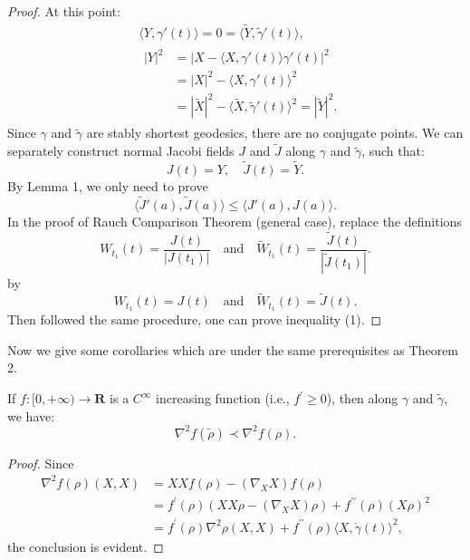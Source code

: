 \documentclass{ctexart}
\begin{document}
\begin{proof}[Proof]
  At this point:
  $$
  \begin{aligned}
  & \langle Y, \gamma'(t)\rangle = 0 = \langle\widetilde{Y}, \tilde{\gamma}'(t)\rangle, \\
  &\begin{aligned}
    |Y|^2 
    &= |X-\langle X, \gamma'(t)\rangle \gamma'(t)|^2 \\
    &= |X|^2-\langle X, \gamma'(t)\rangle^2 \\
    &= |\widetilde{X}|^2-\langle\widetilde{X}, \widetilde{\gamma}'(t)\rangle^2=|\widetilde{Y}|^2 .
    \end{aligned}
  \end{aligned}
  $$
  Since $\gamma$ and $\widetilde{\gamma}$ are stably shortest geodesics, there are no conjugate points. 
  We can separately construct normal Jacobi fields $J$ and $\widetilde{J}$ along $\gamma$ and $\widetilde{\gamma}$, such that:
  $$
  J(t) = Y, \quad \widetilde{J}(t) = \widetilde{Y}.
  $$
  By Lemma 1, we only need to prove 
  \begin{equation}
    \langle \tilde{J}'\left(a\right),\tilde{J}\left(a\right)\rangle \leq \langle J'\left(a\right),J\left(a\right)\rangle. 
  \end{equation}
  In the proof of Rauch Comparison Theorem (general case), replace the definitions 
  $$
  W_{t_1}(t) = \frac{J(t)}{\left|J(t_1)\right|} \quad \text{and} \quad \tilde{W}_{t_1}(t) = \frac{\tilde{J}(t)}{\left|\tilde{J}(t_1)\right|}.
  $$
  by
  $$
  W_{t_1}(t) = J(t) \quad \text{and} \quad \tilde{W}_{t_1}(t) = \tilde{J}(t).
  $$
  Then followed the same procedure, one can prove inequality (1).
\end{proof}

Now we give some corollaries which are under the same prerequisites as Theorem 2.
\begin{corollary}
  If $f:[0, +\infty) \rightarrow \mathbf{R}$ is a $C^\infty$ increasing function (i.e., $f^\prime \geq 0$), then along $\gamma$ and $\widetilde{\gamma}$, we have:
  $$
  \nabla^2 f(\widetilde{\rho}) \prec  \nabla^2 f(\rho).
  $$  
\end{corollary}
\begin{proof}[Proof]
  Since
  $$
  \begin{aligned}
  \nabla^2 f(\rho)(X, X) & = X X f(\rho) - \left(\nabla_X X\right) f(\rho) \\
  & = f^\prime(\rho) \left(X X \rho - \left(\nabla_X X\right) \rho\right) + f^{\prime \prime}(\rho)(X \rho)^2 \\
  & = f^\prime(\rho) \nabla^2 \rho(X, X) + f^{\prime \prime}(\rho)\langle X, \dot{\gamma}(t)\rangle^2,
  \end{aligned}
  $$
  the conclusion is evident.
\end{proof}
\end{document}
